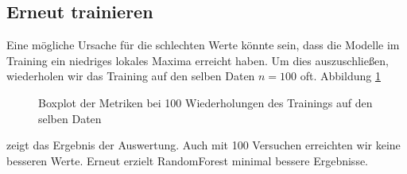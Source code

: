 \documentclass[a4paper,10pt]{scrartcl}
\begin{document}
\subsection{Erneut trainieren}
Eine mögliche Ursache für die schlechten Werte könnte sein, dass die Modelle im Training ein niedriges lokales Maxima erreicht haben. Um dies auszuschließen, wiederholen wir das Training auf den selben Daten $n=100$ oft. Abbildung \ref{fig:localminimum}
\begin{figure}[h]
	\centering
	\caption{Boxplot der Metriken bei 100 Wiederholungen des Trainings auf den selben Daten}
	\label{fig:localminimum}
\end{figure} 
zeigt das Ergebnis der Auswertung. Auch mit 100 Versuchen erreichten wir keine besseren Werte. Erneut erzielt RandomForest minimal bessere Ergebnisse.
\end{document}
